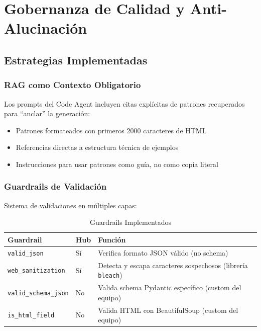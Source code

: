 \documentclass[12pt,a4paper]{article}
\begin{document}
\section{Gobernanza de Calidad y Anti-Alucinación}

\subsection{Estrategias Implementadas}

\subsubsection{RAG como Contexto Obligatorio}

Los prompts del Code Agent incluyen citas explícitas de patrones recuperados para ``anclar'' la generación:

\begin{itemize}
    \item Patrones formateados con primeros 2000 caracteres de HTML
    \item Referencias directas a estructura técnica de ejemplos
    \item Instrucciones para usar patrones como guía, no como copia literal
\end{itemize}

\subsubsection{Guardrails de Validación}

Sistema de validaciones en múltiples capas:

\begin{table}[H]
\centering
\caption{Guardrails Implementados}
\begin{tabular}{llp{5cm}}
\toprule
\textbf{Guardrail} & \textbf{Hub} & \textbf{Función} \\
\midrule
\texttt{valid\_json} & Sí & Verifica formato JSON válido (no schema) \\
\texttt{web\_sanitization} & Sí & Detecta y escapa caracteres sospechosos (librería \texttt{bleach}) \\
\texttt{valid\_schema\_json} & No & Valida schema Pydantic específico (custom del equipo) \\
\texttt{is\_html\_field} & No & Valida HTML con BeautifulSoup (custom del equipo) \\
\bottomrule
\end{tabular}
\end{table}
\end{document}
